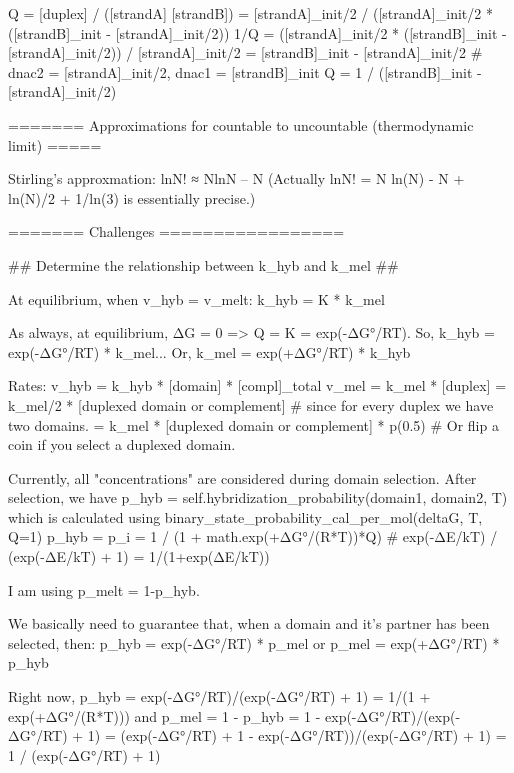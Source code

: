     Q   = [duplex] / ([strandA] [strandB])
        = [strandA]_init/2 / ([strandA]_init/2 * ([strandB]_init - [strandA]_init/2))
    1/Q = ([strandA]_init/2 * ([strandB]_init - [strandA]_init/2)) / [strandA]_init/2
        = [strandB]_init - [strandA]_init/2             # dnac2 = [strandA]_init/2, dnac1 = [strandB]_init
    Q   = 1 / ([strandB]_init - [strandA]_init/2)




======= Approximations for countable to uncountable (thermodynamic limit) =====


Stirling's approxmation:
     lnN! ≈ NlnN – N    (Actually lnN! = N ln(N) - N + ln(N)/2 + 1/ln(3) is essentially precise.)



======= Challenges =================


## Determine the relationship between k_hyb and k_mel ##

    At equilibrium, when v_hyb = v_melt:
        k_hyb = K * k_mel

    As always, at equilibrium, ΔG = 0 => Q = K = exp(-ΔG°/RT).
    So, k_hyb = exp(-ΔG°/RT) * k_mel...
    Or, k_mel = exp(+ΔG°/RT) * k_hyb

    Rates:
        v_hyb = k_hyb * [domain] * [compl]_total
        v_mel = k_mel * [duplex]
              = k_mel/2 * [duplexed domain or complement]           # since for every duplex we have two domains.
              = k_mel * [duplexed domain or complement] * p(0.5)    # Or flip a coin if you select a duplexed domain.

    Currently, all "concentrations" are considered during domain selection.
    After selection, we have
        p_hyb = self.hybridization_probability(domain1, domain2, T)
    which is calculated using binary_state_probability_cal_per_mol(deltaG, T, Q=1)
        p_hyb = p_i = 1 / (1 + math.exp(+ΔG°/(R*T))*Q)      # exp(-ΔE/kT) / (exp(-ΔE/kT) + 1) = 1/(1+exp(ΔE/kT))

    I am using p_melt = 1-p_hyb.

    We basically need to guarantee that, when a domain and it's partner has been selected, then:
        p_hyb = exp(-ΔG°/RT) * p_mel
    or
        p_mel = exp(+ΔG°/RT) * p_hyb

    Right now,
        p_hyb = exp(-ΔG°/RT)/(exp(-ΔG°/RT) + 1) = 1/(1 + exp(+ΔG°/(R*T)))
    and
        p_mel = 1 - p_hyb
              = 1 - exp(-ΔG°/RT)/(exp(-ΔG°/RT) + 1) = (exp(-ΔG°/RT) + 1 - exp(-ΔG°/RT))/(exp(-ΔG°/RT) + 1)
              = 1 / (exp(-ΔG°/RT) + 1)

